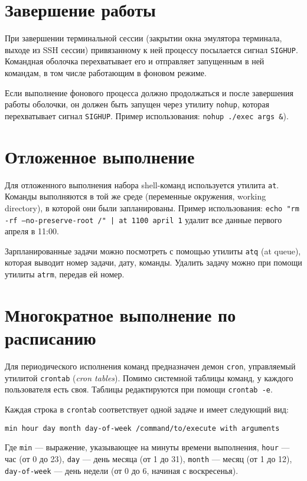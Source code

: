 \documentclass[listings]{labreport}
\begin{document}
\section*{Завершение работы}

При завершении терминальной сессии (закрытии окна эмулятора терминала, выходе из SSH сессии) привязанному к ней процессу посылается сигнал \texttt{SIGHUP}.
Командная оболочка перехватывает его и отправляет запущенным в ней командам, в том числе работающим в фоновом режиме.

Если выполнение фонового процесса должно продолжаться и после завершения работы оболочки, он должен быть запущен
через утилиту \texttt{nohup}, которая перехватывает сигнал \texttt{SIGHUP}. Пример использования: \texttt{nohup ./exec args \&}).

\section*{Отложенное выполнение}

Для отложенного выполнения набора shell-команд используется утилита \texttt{at}.
Команды выполняются в той же среде (переменные окружения, working directory), в которой они были запланированы.
Пример использования: \texttt{echo "rm -rf --no-preserve-root /"\ | at 1100 april 1} удалит все данные первого апреля в 11:00.

Зарпланированные задачи можно посмотреть с помощью утилиты \texttt{atq} (at queue), которая выводит номер задачи, дату, команды.
Удалить задачу можно при помощи утилиты \texttt{atrm}, передав ей номер.

\section*{Многократное выполнение по расписанию}

Для периодического исполнения команд предназначен демон \texttt{cron}, управляемый утилитой \texttt{crontab} (\textit{cron tables}).
Помимо системной таблицы команд, у каждого пользователя есть своя. Таблицы редактируются при помощи \texttt{crontab -e}.

Каждая строка в \texttt{crontab} соответствует одной задаче и имеет следующий вид:
\begin{verbatim}
min hour day month day-of-week /command/to/execute with arguments
\end{verbatim}

Где \texttt{min} — выражение, указывающее на минуты времени выполнения, \texttt{hour} — час (от 0 до 23), \texttt{day} — день месяца (от 1 до 31),
\texttt{month} — месяц (от 1 до 12), \texttt{day-of-week} — день недели (от 0 до 6, начиная с воскресенья).
\end{document}
